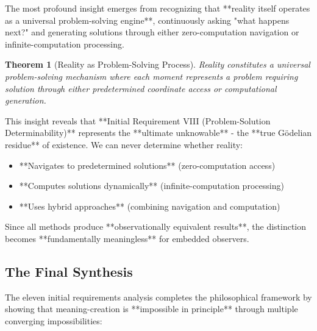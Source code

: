 \documentclass[12pt,a4paper]{article}
\newtheorem{theorem}{Theorem}[section]
\begin{document}
The most profound insight emerges from recognizing that **reality itself operates as a universal problem-solving engine**, continuously asking "what happens next?" and generating solutions through either zero-computation navigation or infinite-computation processing.

\begin{theorem}[Reality as Problem-Solving Process]
Reality constitutes a universal problem-solving mechanism where each moment represents a problem requiring solution through either predetermined coordinate access or computational generation.
\end{theorem}

This insight reveals that **Initial Requirement VIII (Problem-Solution Determinability)** represents the **ultimate unknowable** - the **true Gödelian residue** of existence. We can never determine whether reality:

\begin{itemize}
\item **Navigates to predetermined solutions** (zero-computation access)
\item **Computes solutions dynamically** (infinite-computation processing)  
\item **Uses hybrid approaches** (combining navigation and computation)
\end{itemize}

Since all methods produce **observationally equivalent results**, the distinction becomes **fundamentally meaningless** for embedded observers.

\subsection{The Final Synthesis}

The eleven initial requirements analysis completes the philosophical framework by showing that meaning-creation is **impossible in principle** through multiple converging impossibilities:
\end{document}
